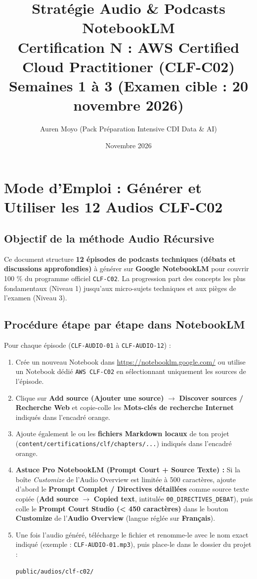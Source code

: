 \documentclass[11pt,a4paper]{article}
\title{\textbf{Stratégie Audio \& Podcasts NotebookLM}\\
\Large Certification N\textdegree 1 : AWS Certified Cloud Practitioner (CLF-C02)\\
\large Semaines 1 à 3 (Examen cible : 20 novembre 2026)}
\author{Auren Moyo (Pack Préparation Intensive CDI Data \& AI)}
\date{Novembre 2026}
\begin{document}
\maketitle
\tableofcontents
\newpage

\section{Mode d'Emploi : Générer et Utiliser les 12 Audios CLF-C02}

\subsection{Objectif de la méthode Audio Récursive}
Ce document structure \textbf{12 épisodes de podcasts techniques (débats et discussions approfondies)} à générer sur \textbf{Google NotebookLM} pour couvrir 100 \% du programme officiel \texttt{CLF-C02}.
La progression part des concepts les plus fondamentaux (Niveau 1) jusqu'aux micro-sujets techniques et aux pièges de l'examen (Niveau 3).

\subsection{Procédure étape par étape dans NotebookLM}
Pour chaque épisode (\texttt{CLF-AUDIO-01} à \texttt{CLF-AUDIO-12}) :
\begin{enumerate}[label=\textbf{Étape \arabic* :}]
    \item Crée un nouveau Notebook dans \url{https://notebooklm.google.com/} ou utilise un Notebook dédié \texttt{AWS CLF-C02} en sélectionnant uniquement les sources de l'épisode.
    \item Clique sur \textbf{Add source (Ajouter une source)} $\rightarrow$ \textbf{Discover sources / Recherche Web} et copie-colle les \textbf{Mots-clés de recherche Internet} indiqués dans l'encadré orange.
    \item Ajoute également le ou les \textbf{fichiers Markdown locaux} de ton projet (\texttt{content/certifications/clf/chapters/...}) indiqués dans l'encadré orange.
    \item \textbf{Astuce Pro NotebookLM (Prompt Court + Source Texte) :} Si la boîte \textit{Customize} de l'Audio Overview est limitée à 500 caractères, ajoute d'abord le \textbf{Prompt Complet / Directives détaillées} comme source texte copiée (\textbf{Add source} $\rightarrow$ \textbf{Copied text}, intitulée \texttt{00\_DIRECTIVES\_DEBAT}), puis colle le \textbf{Prompt Court Studio (< 450 caractères)} dans le bouton \textbf{Customize} de l'\textbf{Audio Overview} (langue réglée sur \textbf{Français}).
    \item Une fois l'audio généré, télécharge le fichier et renomme-le avec le nom exact indiqué (exemple : \texttt{CLF-AUDIO-01.mp3}), puis place-le dans le dossier du projet :
    \begin{center}
        \texttt{public/audios/clf-c02/}
    \end{center}
\end{enumerate}
\end{document}
